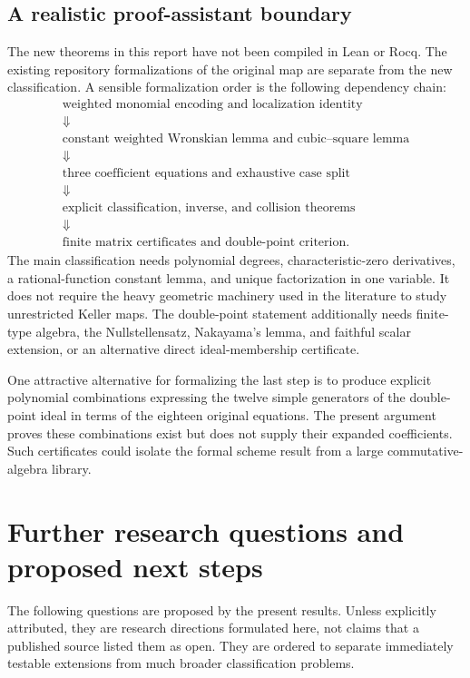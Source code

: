 \documentclass[11pt,a4paper]{article}
\numberwithin{equation}{section}
\theoremstyle{definition}
\theoremstyle{remark}
\begin{document}
\subsection{A realistic proof-assistant boundary}

The new theorems in this report have not been compiled in Lean or Rocq.
The existing repository formalizations of the original map are separate
from the new classification. A sensible formalization order is the
following dependency chain:
\[
\begin{gathered}
\text{weighted monomial encoding and localization identity}\\
\Downarrow\\
\text{constant weighted Wronskian lemma and cubic--square lemma}\\
\Downarrow\\
\text{three coefficient equations and exhaustive case split}\\
\Downarrow\\
\text{explicit classification, inverse, and collision theorems}\\
\Downarrow\\
\text{finite matrix certificates and double-point criterion}.
\end{gathered}
\]
The main classification needs polynomial degrees, characteristic-zero
derivatives, a rational-function constant lemma, and unique factorization
in one variable. It does not require the heavy geometric machinery used
in the literature to study unrestricted Keller maps. The double-point
statement additionally needs finite-type algebra, the Nullstellensatz,
Nakayama's lemma, and faithful scalar extension, or an alternative direct
ideal-membership certificate.

One attractive alternative for formalizing the last step is to produce
explicit polynomial combinations expressing the twelve simple generators
of the double-point ideal in terms of the eighteen original equations.
The present argument proves these combinations exist but does not supply
their expanded coefficients. Such certificates could isolate the formal
scheme result from a large commutative-algebra library.

\section{Further research questions and proposed next steps}
\label{wkr:sec:future}

The following questions are proposed by the present results. Unless
explicitly attributed, they are research directions formulated here, not
claims that a published source listed them as open. They are ordered to
separate immediately testable extensions from much broader classification
problems.
\end{document}
